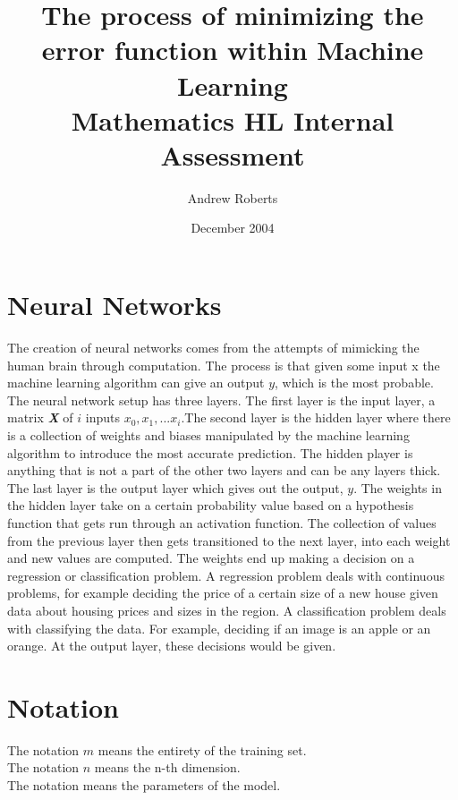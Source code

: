 \documentclass[a4paper,12pt]{article}
\begin{document}
\title{%
  The process of minimizing the error function within Machine Learning \\
  \small Mathematics HL Internal Assessment}
\author{Andrew Roberts}
\date{December 2004}
\maketitle
\pagebreak

\section{Neural Networks}
The creation of neural networks comes from the attempts of mimicking the human brain through computation. The process is that given some input x the machine learning algorithm can give an output \(y\), which is the most probable. The neural network setup has three layers. The first layer is the input layer, a matrix \textbf{\emph{X}} of \(i\) inputs \(x_0,x_1,...x_i\).The second layer is the hidden layer where there is a collection of weights and biases manipulated by the machine learning algorithm to introduce the most accurate prediction. The hidden player is anything that is not a part of the other two layers and can be any layers thick. The last layer is the output layer which gives out the output, \(y\). The weights in the hidden layer take on a certain probability value based on a hypothesis function that gets run through an activation function. The collection of values from the previous layer then gets transitioned to the next layer, into each weight and new values are computed. The weights end up making a decision on a regression or classification problem. A regression problem deals with continuous problems, for example deciding the price of a certain size of a new house given data about housing prices and sizes in the region. A classification problem deals with classifying the data. For example, deciding if an image is an apple or an orange. At the output layer, these decisions would be given.

\section{Notation}
The notation \(m\) means the entirety of the training set. \\
The notation \(n\) means the n-th dimension.  \\
The notation \boldmath{$\Theta$}\unboldmath means the parameters of the model.  
\end{document}
